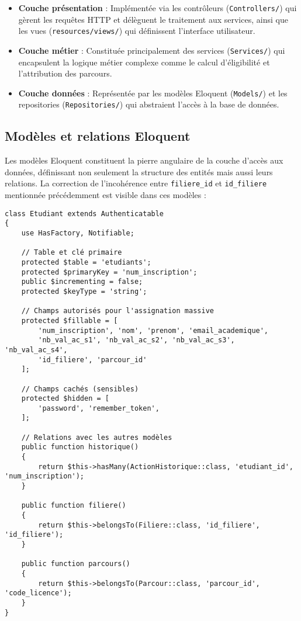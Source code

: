 \documentclass[french,12pt]{report} %
\begin{document}
\begin{itemize}
    \item \textbf{Couche présentation} : Implémentée via les contrôleurs (\texttt{Controllers/}) qui gèrent les requêtes HTTP et délèguent le traitement aux services, ainsi que les vues (\texttt{resources/views/}) qui définissent l'interface utilisateur.
    \item \textbf{Couche métier} : Constituée principalement des services (\texttt{Services/}) qui encapsulent la logique métier complexe comme le calcul d'éligibilité et l'attribution des parcours.
    \item \textbf{Couche données} : Représentée par les modèles Eloquent (\texttt{Models/}) et les repositories (\texttt{Repositories/}) qui abstraient l'accès à la base de données.
\end{itemize}

\subsection{Modèles et relations Eloquent}

Les modèles Eloquent constituent la pierre angulaire de la couche d'accès aux données, définissant non seulement la structure des entités mais aussi leurs relations. La correction de l'incohérence entre \texttt{filiere\_id} et \texttt{id\_filiere} mentionnée précédemment est visible dans ces modèles :

\begin{lstlisting}[style=phpstyle,caption={Modèle Etudiant avec ses relations}]
class Etudiant extends Authenticatable
{
    use HasFactory, Notifiable;
    
    // Table et clé primaire
    protected $table = 'etudiants';
    protected $primaryKey = 'num_inscription';
    public $incrementing = false;
    protected $keyType = 'string';
    
    // Champs autorisés pour l'assignation massive
    protected $fillable = [
        'num_inscription', 'nom', 'prenom', 'email_academique',
        'nb_val_ac_s1', 'nb_val_ac_s2', 'nb_val_ac_s3', 'nb_val_ac_s4',
        'id_filiere', 'parcour_id'
    ];
    
    // Champs cachés (sensibles)
    protected $hidden = [
        'password', 'remember_token',
    ];
    
    // Relations avec les autres modèles
    public function historique()
    {
        return $this->hasMany(ActionHistorique::class, 'etudiant_id', 'num_inscription');
    }
    
    public function filiere()
    {
        return $this->belongsTo(Filiere::class, 'id_filiere', 'id_filiere');
    }
    
    public function parcours()
    {
        return $this->belongsTo(Parcour::class, 'parcour_id', 'code_licence');
    }
}
\end{lstlisting}
\end{document}
